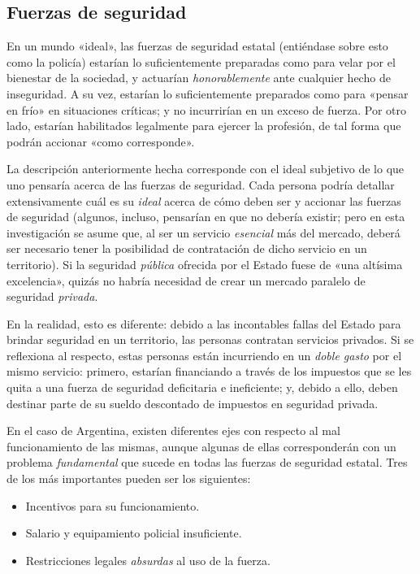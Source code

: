 \documentclass[12pt,a4paper,twoside]{book}
\begin{document}
\subsection{Fuerzas de seguridad}
En un mundo «ideal», las fuerzas de seguridad estatal (entiéndase sobre esto como la policía) estarían lo suficientemente preparadas como para velar por el bienestar de la sociedad, y actuarían \textit{honorablemente} ante cualquier hecho de inseguridad. A su vez, estarían lo suficientemente preparados como para «pensar en frío» en situaciones críticas; y no incurrirían en un exceso de fuerza. Por otro lado, estarían habilitados legalmente para ejercer la profesión, de tal forma que podrán accionar «como corresponde».

La descripción anteriormente hecha corresponde con el ideal subjetivo de lo que uno pensaría acerca de las fuerzas de seguridad. Cada persona podría detallar extensivamente cuál es su \textit{ideal} acerca de cómo deben ser y accionar las fuerzas de seguridad (algunos, incluso, pensarían en que no debería existir; pero en esta investigación se asume que, al ser un servicio \textit{esencial} más del mercado, deberá ser necesario tener la posibilidad de contratación de dicho servicio en un territorio). Si la seguridad \textit{pública} ofrecida por el Estado fuese de «una altísima excelencia», quizás no habría necesidad de crear un mercado paralelo de seguridad \textit{privada}.

En la realidad, esto es diferente: debido a las incontables fallas del Estado para brindar seguridad en un territorio, las personas contratan servicios privados. Si se reflexiona al respecto, estas personas están incurriendo en un \textit{doble gasto} por el mismo servicio: primero, estarían financiando a través de los impuestos que se les quita a una fuerza de seguridad deficitaria e ineficiente; y, debido a ello, deben destinar parte de su sueldo descontado de impuestos en seguridad privada.

En el caso de Argentina, existen diferentes ejes con respecto al mal funcionamiento de las mismas, aunque algunas de ellas corresponderán con un problema \textit{fundamental} que sucede en todas las fuerzas de seguridad estatal. Tres de los más importantes pueden ser los siguientes:

\begin{itemize}
\item Incentivos para su funcionamiento.
\item Salario y equipamiento policial insuficiente.
\item Restricciones legales \textit{absurdas} al uso de la fuerza.
\end{itemize}
\end{document}
